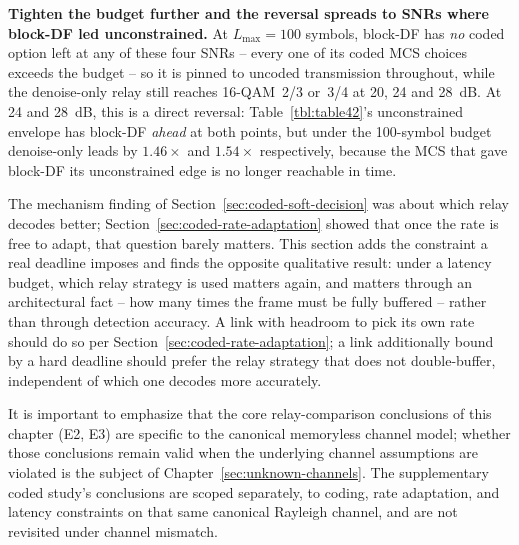 \textbf{Tighten the budget further and the reversal spreads to SNRs where block-DF led unconstrained.} At $L_{\max}=100$ symbols, block-DF has \emph{no} coded option left at any of these four SNRs -- every one of its coded MCS choices exceeds the budget -- so it is pinned to uncoded transmission throughout, while the denoise-only relay still reaches 16-QAM~2/3 or~3/4 at 20, 24 and 28~dB. At 24 and 28~dB, this is a direct reversal: Table~\ref{tbl:table42}'s unconstrained envelope has block-DF \emph{ahead} at both points, but under the 100-symbol budget denoise-only leads by $1.46\times$ and $1.54\times$ respectively, because the MCS that gave block-DF its unconstrained edge is no longer reachable in time.

The mechanism finding of Section~\ref{sec:coded-soft-decision} was about which relay decodes better; Section~\ref{sec:coded-rate-adaptation} showed that once the rate is free to adapt, that question barely matters. This section adds the constraint a real deadline imposes and finds the opposite qualitative result: under a latency budget, which relay strategy is used matters again, and matters through an architectural fact -- how many times the frame must be fully buffered -- rather than through detection accuracy. A link with headroom to pick its own rate should do so per Section~\ref{sec:coded-rate-adaptation}; a link additionally bound by a hard deadline should prefer the relay strategy that does not double-buffer, independent of which one decodes more accurately.

It is important to emphasize that the core relay-comparison conclusions of this chapter (E2, E3) are specific to the canonical memoryless channel model; whether those conclusions remain valid when the underlying channel assumptions are violated is the subject of Chapter~\ref{sec:unknown-channels}. The supplementary coded study's conclusions are scoped separately, to coding, rate adaptation, and latency constraints on that same canonical Rayleigh channel, and are not revisited under channel mismatch.
